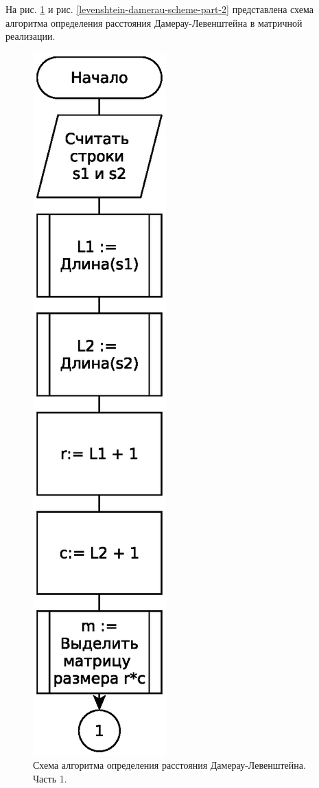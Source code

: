 \FloatBarrier

На рис. \ref{levenshtein-damerau-scheme-part-1} и рис. \ref{levenshtein-damerau-scheme-part-2} представлена схема алгоритма определения расстояния Дамерау-Левенштейна в матричной реализации.

\begin{figure}
    \centering
    \includegraphics[height=0.75\textheight]{schemes/levenshtein-damerau-eps-1}
    \caption{Схема алгоритма определения расстояния Дамерау-Левенштейна. Часть 1.}
    \label{levenshtein-damerau-scheme-part-1}
\end{figure}

